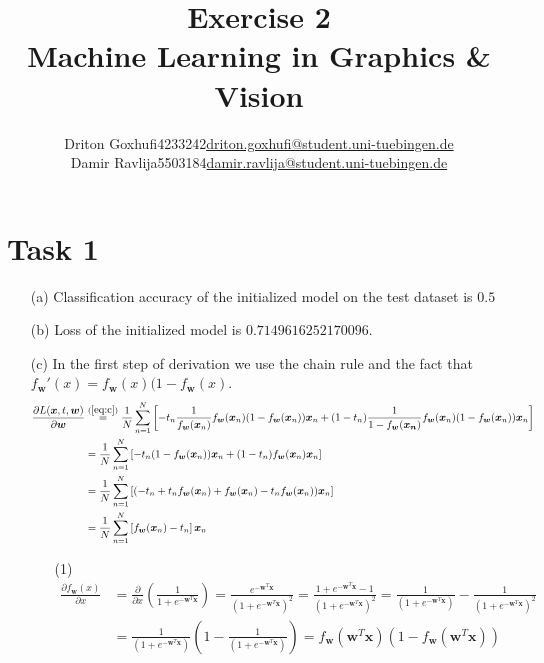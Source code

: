 \documentclass [a4paper, 11pt] {article}
\makeatletter
\newcommand{\courseName}{Machine Learning in Graphics \& Vision}
\newcommand{\homeworkNum}{2}
\newcommand{\studentOne}{Driton Goxhufi}
\newcommand{\studentTwo} {Damir Ravlija}
\newcommand{\matrikelNrStOne}{4233242}
\newcommand{\matrikelNrStTwo}{5503184}
\newcommand{\mailStOne}{driton.goxhufi@student.uni-tuebingen.de}
\newcommand{\mailStTwo}{damir.ravlija@student.uni-tuebingen.de}
\renewcommand{\v}[1]{\boldsymbol{#1}}
\makeatother
\begin{document}
	
\title{\vspace{-1.5cm}\textbf{Exercise \homeworkNum} \\ 
	\courseName}
\author{\begin{tabular}{lcr}
		\studentOne & \matrikelNrStOne & \href{mailto:\mailStOne}{\mailStOne} \\
		\studentTwo & \matrikelNrStTwo & \href{mailto:\mailStTwo}{\mailStTwo} 
\end{tabular}}	
\date{}
\maketitle


\section{Task 1}
\begin{enumerate}
\item[(a)]
Classification accuracy of the initialized model on the test dataset is $0.5$


\item[(b)]
Loss of the initialized model is $0.7149616252170096$.

\item[(c)]
In the first step of derivation we use the chain rule and the fact that $f_{\v{w}}'(x) = f_{\v{w}}(x)(1-f_{\v{w}}(x)$.
\begin{align*}
\frac{\partial L(\v{x}, t, \v{w})}{\partial \v{w}} &\stackrel{(\ref{eq:c})}{=} \frac{1}{N}\sum_{n=1}^{N}\left[-t_n \frac{1}{f_{\v{w}}(\v{x}_n)}f_{\v{w}}(\v{x}_n)(1-f_{\v{w}}(\v{x}_n))\v{x}_n + (1-t_n)\frac{1}{1-f_{\v{w}}(\v{x_n})}f_{\v{w}}(\v{x}_n)(1-f_{\v{w}}(\v{x}_n))\v{x}_n \right] \\
&= \frac{1}{N}\sum_{n=1}^{N}\left[-t_n(1-f_{\v{w}}(\v{x}_n))\v{x}_n + (1-t_n)f_{\v{w}}(\v{x}_n)\v{x}_n \right] \\
&= \frac{1}{N}\sum_{n=1}^{N}\left[(-t_n + t_n f_{\v{w}}(\v{x}_n) + f_{\v{w}}(\v{x}_n) - t_nf_{\v{w}}(\v{x}_n))\v{x}_n\right] \\
&= \frac{1}{N}\sum_{n=1}^{N}\left[ f_{\v{w}}(\v{x}_n) - t_n\right]\v{x}_n
\end{align*}

\begin{enumerate}
	\item[(1)]\label{eq:c} 
	\begin{align*}
	\frac{\partial f_{\v{w}}(x)}{\partial x} &= \frac{\partial}{\partial x}\left(\frac{1}{1 + e^{-\v{w}^{T}\v{x}}}\right) = \frac{e^{-\v{w}^{T}\v{x}}}{{(1 + e^{-\v{w}^{T}\v{x}})}^2} = \frac{1 + e^{-\v{w}^{T}\v{x}} - 1}{{(1 + e^{-\v{w}^{T}\v{x}})}^2} = \frac{1}{{(1 + e^{-\v{w}^{T}\v{x}})}} - \frac{1}{{(1 + e^{-\v{w}^{T}\v{x}})}^2} \\
	&= \frac{1}{{(1 + e^{-\v{w}^{T}\v{x}})}} \left(1 - \frac{1}{{(1 + e^{-\v{w}^{T}\v{x}})}}\right) = f_{\v{w}}(\v{w}^{T}\v{x})(1 - f_{\v{w}}(\v{w}^{T}\v{x}))
	\end{align*}
\end{enumerate}


\end{enumerate}
\end{document}

